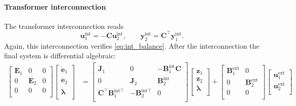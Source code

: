 \documentclass{svjour3}                     %
\begin{document}
	\paragraph{Transformer interconnection}
	The transformer interconnection reads
	\begin{equation*}
	\mathbf{u}_1^{\text{int}} = -\mathbf{C} \mathbf{u}_2^{\text{int}}, \qquad
	\mathbf{y}_2^{\text{int}} = \mathbf{C}^\top \mathbf{y}_1^{\text{int}}.
	\end{equation*}
	Again, this interconnection verifies \eqref{eq:int_balance}. After the interconnection the final system is differential algebraic:
	\begin{align*}
	\begin{bmatrix}
	\mathbf{E}_1 & 0 & 0 \\ 
	0 & \mathbf{E}_2 & 0 \\
	0 & 0 & 0 \\
	\end{bmatrix}
	\begin{bmatrix}
	\dot{\mathbf{e}}_1 \\ \dot{\mathbf{e}}_2 \\ \dot{\bm{\lambda}} \\
	\end{bmatrix} &= 
	\begin{bmatrix}
	\mathbf{J}_1 & 0 & -\mathbf{B}_1^{\text{int}} \mathbf{C} \\ 
	0 & \mathbf{J}_2 & \mathbf{B}_2^{\text{int}} \\
	\mathbf{C}^\top \mathbf{B}_1^{\text{int} \top} & - \mathbf{B}_2^{\text{int} \top} & 0 \\
	\end{bmatrix}
	\begin{bmatrix}
	\mathbf{z}_1 \\ 
	\mathbf{z}_2 \\
	\bm{\lambda} \\
	\end{bmatrix}+ 
	\begin{bmatrix}
	\mathbf{B}_1^{\text{ext}} & 0 \\ 0 & \mathbf{B}_2^{\text{ext}} \\ 0 & 0 \\
	\end{bmatrix} 
	\begin{bmatrix}
	\mathbf{u}_1^{\text{ext}} \\ 
	\mathbf{u}_2^{\text{ext}} \\
	\end{bmatrix} \\

\end{align*}
\end{document}
